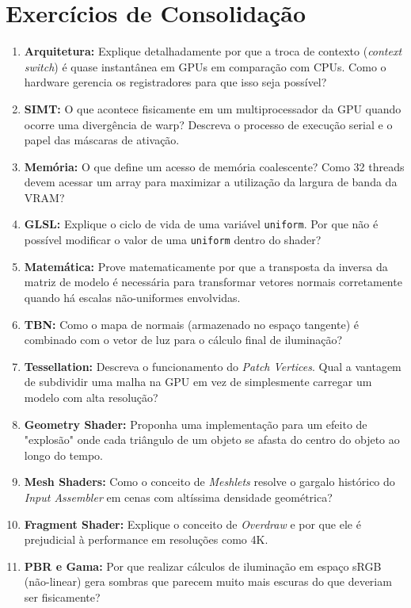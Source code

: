 \section*{Exercícios de Consolidação}

\begin{enumerate}
    \item \textbf{Arquitetura:} Explique detalhadamente por que a troca de contexto (\textit{context switch}) é quase instantânea em GPUs em comparação com CPUs. Como o hardware gerencia os registradores para que isso seja possível?
    \item \textbf{SIMT:} O que acontece fisicamente em um multiprocessador da GPU quando ocorre uma divergência de warp? Descreva o processo de execução serial e o papel das máscaras de ativação.
    \item \textbf{Memória:} O que define um acesso de memória coalescente? Como 32 threads devem acessar um array para maximizar a utilização da largura de banda da VRAM?
    \item \textbf{GLSL:} Explique o ciclo de vida de uma variável \texttt{uniform}. Por que não é possível modificar o valor de uma \texttt{uniform} dentro do shader?
    \item \textbf{Matemática:} Prove matematicamente por que a transposta da inversa da matriz de modelo é necessária para transformar vetores normais corretamente quando há escalas não-uniformes envolvidas.
    \item \textbf{TBN:} Como o mapa de normais (armazenado no espaço tangente) é combinado com o vetor de luz para o cálculo final de iluminação?
    \item \textbf{Tessellation:} Descreva o funcionamento do \textit{Patch Vertices}. Qual a vantagem de subdividir uma malha na GPU em vez de simplesmente carregar um modelo com alta resolução?
    \item \textbf{Geometry Shader:} Proponha uma implementação para um efeito de "explosão" onde cada triângulo de um objeto se afasta do centro do objeto ao longo do tempo.
    \item \textbf{Mesh Shaders:} Como o conceito de \textit{Meshlets} resolve o gargalo histórico do \textit{Input Assembler} em cenas com altíssima densidade geométrica?
    \item \textbf{Fragment Shader:} Explique o conceito de \textit{Overdraw} e por que ele é prejudicial à performance em resoluções como 4K.
    \item \textbf{PBR e Gama:} Por que realizar cálculos de iluminação em espaço sRGB (não-linear) gera sombras que parecem muito mais escuras do que deveriam ser fisicamente?

\end{enumerate}
